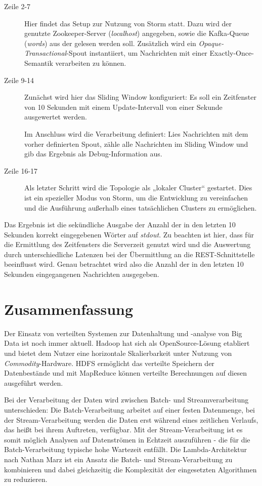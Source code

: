 \documentclass[a4paper,11pt]{scrartcl}
\begin{document}
  \begin{description}
    \item[Zeile 2-7] Hier findet das Setup zur Nutzung von Storm statt. Dazu
      wird der genutzte Zookeeper-Server (\textit{localhost}) angegeben, sowie
      die Kafka-Queue (\textit{words}) aus der gelesen werden soll. Zusätzlich
      wird ein \textit{Opaque-Transactional}-Spout instantiiert, um
      Nachrichten mit einer Exactly-Once-Semantik verarbeiten zu können.
    \item[Zeile 9-14] Zunächst wird hier das Sliding Window konfiguriert: Es
      soll ein Zeitfenster von 10 Sekunden mit einem Update-Intervall von einer
      Sekunde ausgewertet werden. 
      
      Im Anschluss wird die Verarbeitung definiert: Lies Nachrichten mit dem
      vorher definierten Spout, zähle alle Nachrichten im Sliding Window und
      gib das Ergebnis als Debug-Information aus.
    \item[Zeile 16-17] Als letzter Schritt wird die Topologie als „lokaler
      Cluster“ gestartet. Dies ist ein spezieller Modus von Storm, um die
      Entwicklung zu vereinfachen und die Ausführung außerhalb eines
      tatsächlichen Clusters zu ermöglichen.
  \end{description}

  Das Ergebnis ist die sekündliche Ausgabe der Anzahl der in den letzten 10
  Sekunden korrekt eingegebenen Wörter auf \textit{stdout}. Zu beachten ist
  hier, dass für die Ermittlung des Zeitfensters die Serverzeit genutzt wird
  und die Auswertung durch unterschiedliche Latenzen bei der Übermittlung an
  die REST-Schnittstelle beeinflusst wird. Genau betrachtet wird also die
  Anzahl der in den letzten 10 Sekunden eingegangenen Nachrichten ausgegeben.

  \section{Zusammenfassung}
  Der Einsatz von verteilten Systemen zur Datenhaltung und -analyse von Big
  Data ist noch immer aktuell. Hadoop hat sich als OpenSource-Lösung etabliert
  und bietet dem Nutzer eine horizontale Skalierbarkeit unter Nutzung von
  \textit{Commodity}-Hardware. HDFS ermöglicht das verteilte Speichern der
  Datenbestände und mit MapReduce können verteilte Berechnungen auf diesen
  ausgeführt werden.

  Bei der Verarbeitung der Daten wird zwischen Batch- und Streamverarbeitung
  unterschieden: Die Batch-Verarbeitung arbeitet auf einer festen Datenmenge,
  bei der Stream-Verarbeitung werden die Daten erst während eines zeitlichen
  Verlaufs, das heißt bei ihrem Auftreten, verfügbar. Mit der
  Stream-Verarbeitung ist es somit möglich Analysen auf Datenströmen in
  Echtzeit auszuführen - die für die Batch-Verarbeitung typische hohe Wartezeit
  entfällt. Die Lambda-Architektur nach Nathan Marz ist ein Ansatz die Batch-
  und Stream-Verarbeitung zu kombinieren und dabei gleichzeitig die Komplexität
  der eingesetzten Algorithmen zu reduzieren. 
\end{document}

